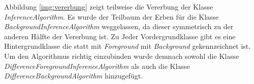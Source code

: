 Abbildung \ref{img:vererbung} zeigt teilweise die Vererbung der Klasse \textit{InferenceAlgorithm}. Es wurde der Teilbaum der Erben für die Klasse \textit{BackgroundInferenceAlgorithm} weggelassen, da dieser symmetrisch zu der anderen Hälfte der Vererbung ist. Zu Jeder Vordergrundklasse gibt es eine Hintergrundklasse die statt mit \textit{Foreground} mit \textit{Background} gekennzeichnet ist. Um den Algorithmus richtig einzubinden wurde demnach sowohl die Klasse \textit{DifferenceForegroundInferenceAlgorithm} als auch die Klasse \textit{DifferenceBackgroundAlgorithm} hinzugefügt.

